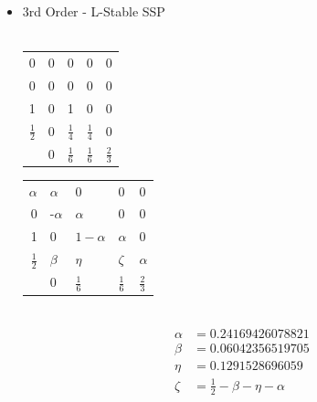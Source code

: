 \documentclass[10pt]{beamer}
\begin{document}
    \begin{frame}
      \begin{itemize}
        \item 3rd Order - L-Stable SSP \hfill \\ \hfill \\
          \begin{tabular}{r|llll}
            0 & 0 & 0 & 0 & 0 \\
            0 & 0 & 0 & 0 & 0 \\
            1 & 0 & 1 & 0 & 0 \\
            $\frac{1}{2}$ & 0 & $\frac{1}{4}$ & $\frac{1}{4}$ & 0 \\
            \midrule
              & 0 & $\frac{1}{6}$ & $\frac{1}{6}$ & $\frac{2}{3}$ \\
          \end{tabular} \hspace{0.5cm}
          \begin{tabular}{r|llll}
            $\alpha$ & $\alpha$ & 0 & 0 & 0 \\
            0 & -$\alpha$ & $\alpha$ & 0 & 0 \\
            1 & 0 & $1 - \alpha$ & $\alpha$ & 0 \\
            $\frac{1}{2}$ & $\beta$ & $\eta$ & $\zeta$ & $\alpha$ \\
            \midrule
              & 0 & $\frac{1}{6}$ & $\frac{1}{6}$ & $\frac{2}{3}$ \\
          \end{tabular} \\
          \begin{align*}
            \alpha &= 0.24169426078821 \\
            \beta &= 0.06042356519705 \\
            \eta &= 0.1291528696059 \\
            \zeta &= \frac{1}{2} - \beta - \eta - \alpha
          \end{align*}
      \end{itemize}
    \end{frame}
\end{document}
